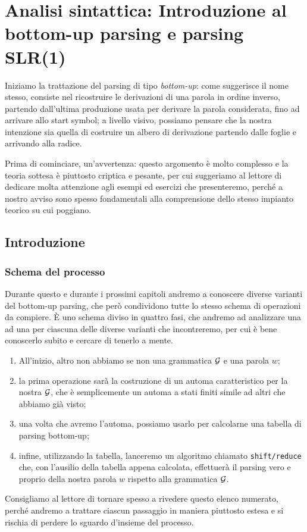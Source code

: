 \documentclass[class=book, crop=false, oneside, 12pt]{standalone}
\begin{document}
\chapter[Parsing bottom-up: introduzione e SLR(1)]{Analisi sintattica: Introduzione al bottom-up parsing e parsing SLR(1)}
Iniziamo la trattazione del parsing di tipo \emph{bottom-up}: come suggerisce il nome stesso, consiste nel ricostruire le derivazioni di una parola in ordine inverso, partendo dall'ultima produzione usata per derivare la parola considerata, fino ad arrivare allo start symbol; a livello visivo, possiamo pensare che la nostra intenzione sia quella di costruire un albero di derivazione partendo dalle foglie e arrivando alla radice. 

Prima di cominciare, un'avvertenza: questo argomento è molto complesso e la teoria sottesa è piuttosto criptica e pesante, per cui suggeriamo al lettore di dedicare molta attenzione agli esempi ed esercizi che presenteremo, perché a nostro avviso sono spesso fondamentali alla comprensione dello stesso impianto teorico su cui poggiano.

\section{Introduzione}
\subsection{Schema del processo}
\label{subsec:schema}
Durante questo e durante i prossimi capitoli andremo a conoscere diverse varianti del bottom-up parsing, che però condividono tutte lo stesso schema di operazioni da compiere. È uno schema diviso in quattro fasi, che andremo ad analizzare una ad una per ciascuna delle diverse varianti che incontreremo, per cui è bene conoscerlo subito e cercare di tenerlo a mente.
\begin{enumerate}
    \item All'inizio, altro non abbiamo se non una grammatica \(\mathcal{G}\) e una parola \(w\);
    \item la prima operazione sarà la costruzione di un automa caratteristico per la nostra \(\mathcal{G}\), che è semplicemente un automa a stati finiti simile ad altri che abbiamo già visto;
    \item una volta che avremo l'automa, possiamo usarlo per calcolarne una tabella di parsing bottom-up;
    \item infine, utilizzando la tabella, lanceremo un algoritmo chiamato \texttt{shift/reduce} che, con l'ausilio della tabella appena calcolata, effettuerà il parsing vero e proprio della nostra parola \(w\) rispetto alla grammatica \(\mathcal{G}\).
\end{enumerate}
Consigliamo al lettore di tornare spesso a rivedere questo elenco numerato, perché andremo a trattare ciascun passaggio in maniera piuttosto estesa e si rischia di perdere lo sguardo d'insieme del processo.
\end{document}
